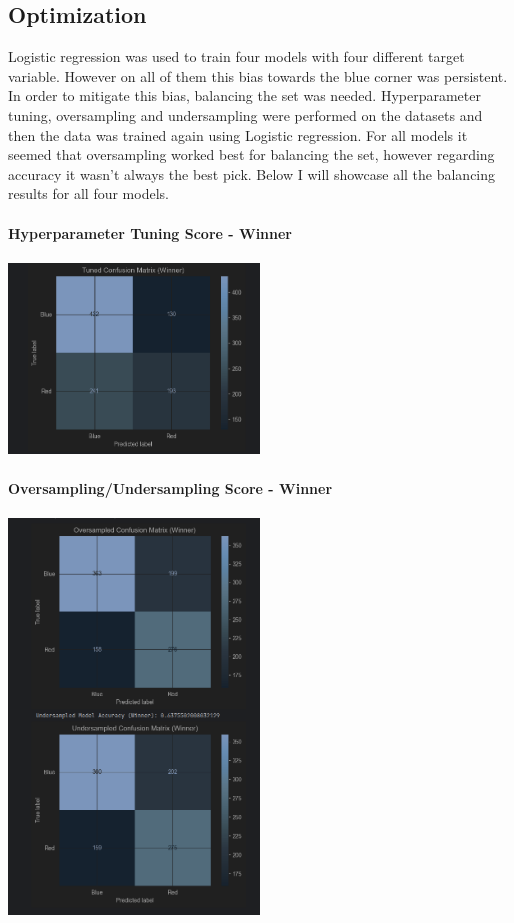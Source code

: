 \documentclass{article}
\begin{document}
\subsection{Optimization}
Logistic regression was used to train four models with four different target variable. However on all of them this bias towards the blue corner was persistent. In order to mitigate this bias, balancing the set was needed. Hyperparameter tuning, oversampling and undersampling were performed on the datasets and then the data was trained again using Logistic regression. For all models it seemed that oversampling worked best for balancing the set, however regarding accuracy it wasn't always the best pick.
Below I will showcase all the balancing results for all four models.\\\\


	{\large \textbf{Hyperparameter Tuning Score - Winner}}\\\\
	\includegraphics[width=0.5\textwidth]{images/CM_Hyp_Winner.png}\\\\

	{\large \textbf{Oversampling/Undersampling Score - Winner}}\\\\
	\includegraphics[width=0.5\textwidth]{images/CM_U_O_Win.png}\\\\
	
\end{document}
